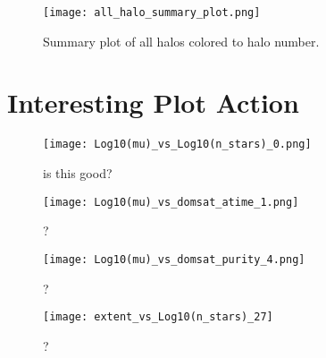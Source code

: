 \documentclass[11pt,a4paper,fleqn,notitlepage,oneside]{article}
\begin{document}
	\begin{figure}[H]
		\texttt{[image: all\_halo\_summary\_plot.png]}
		\caption{
			Summary plot of all halos colored to halo number. 
		}
		\label{fig:all halos - summary plot}
	\end{figure}



\section{Interesting Plot Action} %
	\label{sec:interesting_plot_action}

	\begin{figure}[H]
		\texttt{[image: Log10(mu)\_vs\_Log10(n\_stars)\_0.png]}
		\caption{
			is this good? 
		}
		\label{fig:Log10(mu)_vs_domsat_purity_5}
		\end{figure}

	\begin{figure}[H]
		\texttt{[image: Log10(mu)\_vs\_domsat\_atime\_1.png]}
		\caption{
			? 
		}
		\label{fig:Log10(mu)_vs_domsat_purity_5}
	\end{figure}

	\begin{figure}[H]
		\texttt{[image: Log10(mu)\_vs\_domsat\_purity\_4.png]}
		\caption{
			? 
		}
		\label{fig:Log10(mu)_vs_domsat_purity_5t}
	\end{figure}

	\begin{figure}[H]
		\texttt{[image: extent\_vs\_Log10(n\_stars)\_27]}
		\caption{
			? 
		}
		\label{fig:extent_vs_Log10(n_stars)_27}
	\end{figure}
\end{document}
